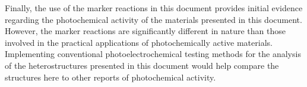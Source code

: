 Finally, the use of the marker reactions in this document provides initial evidence regarding the photochemical activity of the materials presented in this document. However, the marker reactions are significantly different in nature than those involved in the practical applications of photochemically active materials. Implementing conventional photoelectrochemical testing methods for the analysis of the heterostructures presented in this document would help compare the structures here to other reports of photochemical activity. 
